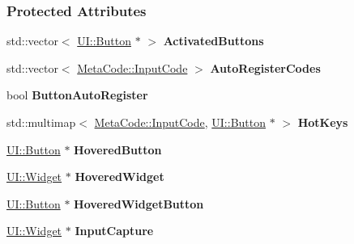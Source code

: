 \subsubsection*{Protected Attributes}
\begin{DoxyCompactItemize}
\item 
\hypertarget{classphys_1_1UIManager_a519fd2a2f1febb4c3d2a647a512c7581}{
std::vector$<$ \hyperlink{classphys_1_1UI_1_1Button}{UI::Button} $\ast$ $>$ {\bfseries ActivatedButtons}}
\label{classphys_1_1UIManager_a519fd2a2f1febb4c3d2a647a512c7581}

\item 
\hypertarget{classphys_1_1UIManager_affa048cc6e6930ba0f0b18fb4ee94c2e}{
std::vector$<$ \hyperlink{classphys_1_1MetaCode_a3e501cbb5bf0f6f1fdb7211465bda8d8}{MetaCode::InputCode} $>$ {\bfseries AutoRegisterCodes}}
\label{classphys_1_1UIManager_affa048cc6e6930ba0f0b18fb4ee94c2e}

\item 
\hypertarget{classphys_1_1UIManager_a7c4cec440bfdfe8d1c1b0bf052edd842}{
bool {\bfseries ButtonAutoRegister}}
\label{classphys_1_1UIManager_a7c4cec440bfdfe8d1c1b0bf052edd842}

\item 
\hypertarget{classphys_1_1UIManager_a6b43cf8529d403ff13d1ba342847d006}{
std::multimap$<$ \hyperlink{classphys_1_1MetaCode_a3e501cbb5bf0f6f1fdb7211465bda8d8}{MetaCode::InputCode}, \hyperlink{classphys_1_1UI_1_1Button}{UI::Button} $\ast$ $>$ {\bfseries HotKeys}}
\label{classphys_1_1UIManager_a6b43cf8529d403ff13d1ba342847d006}

\item 
\hypertarget{classphys_1_1UIManager_a37293b9d9ba8b05c9a03e4640a56c6c1}{
\hyperlink{classphys_1_1UI_1_1Button}{UI::Button} $\ast$ {\bfseries HoveredButton}}
\label{classphys_1_1UIManager_a37293b9d9ba8b05c9a03e4640a56c6c1}

\item 
\hypertarget{classphys_1_1UIManager_a3bcf192e061273695e99a85484c5056a}{
\hyperlink{classphys_1_1UI_1_1Widget}{UI::Widget} $\ast$ {\bfseries HoveredWidget}}
\label{classphys_1_1UIManager_a3bcf192e061273695e99a85484c5056a}

\item 
\hypertarget{classphys_1_1UIManager_aed72bede8e73d9d083e6faf352e60c0d}{
\hyperlink{classphys_1_1UI_1_1Button}{UI::Button} $\ast$ {\bfseries HoveredWidgetButton}}
\label{classphys_1_1UIManager_aed72bede8e73d9d083e6faf352e60c0d}

\item 
\hypertarget{classphys_1_1UIManager_aefa756d0c982299df8567e92c9de6c46}{
\hyperlink{classphys_1_1UI_1_1Widget}{UI::Widget} $\ast$ {\bfseries InputCapture}}
\label{classphys_1_1UIManager_aefa756d0c982299df8567e92c9de6c46}


\end{DoxyCompactItemize}
